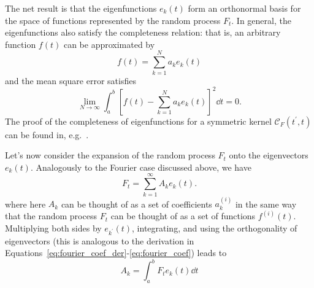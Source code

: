 The net result is that the eigenfunctions $e_k(t)$ form an orthonormal
basis for the space of functions represented by the random process $F_t$.
In general, the eigenfunctions
also satisfy the completeness relation: that is, 
an arbitrary function $f(t)$ can be approximated by
\begin{equation}
  f(t) = \sum_{k=1}^N a_k e_k(t)
\end{equation}
and the mean square error satisfies
\begin{equation}
  \lim_{N\to\infty} \int_a^b
  \left[f(t) - \sum_{k=1}^{N}a_k e_k(t)\right]^2 \dd t = 0.
\end{equation}
The proof of the completeness of eigenfunctions for a symmetric kernel
$\mathcal{C}_F(t^\prime, t)$ can be found in, e.g.~\citet{Courant1989}.

Let's now consider the expansion of the random process $F_t$ onto the
eigenvectors $e_k(t)$.  Analogously to the Fourier case discussed
above, we have
\begin{equation}
  \label{eq:Ft_decomp}
  F_t = \sum_{k=1}^\infty A_k e_k(t).
\end{equation}
where here $A_k$ can be thought of as a set of coefficients $a_k^{(i)}$
in the same way that the random process $F_t$ can be thought of as a
set of functions $f^{(i)}(t)$.
Multiplying both sides by $e_{k^\prime}(t)$, integrating, and using the
orthogonality of eigenvectors (this is analogous to the derivation
in Equations~\ref{eq:fourier_coef_der}-\ref{eq:fourier_coef}) leads to
\begin{equation}
  \label{eq:F_k_def}
  A_k = \int_a^b F_t e_k(t) \dd t
\end{equation}

